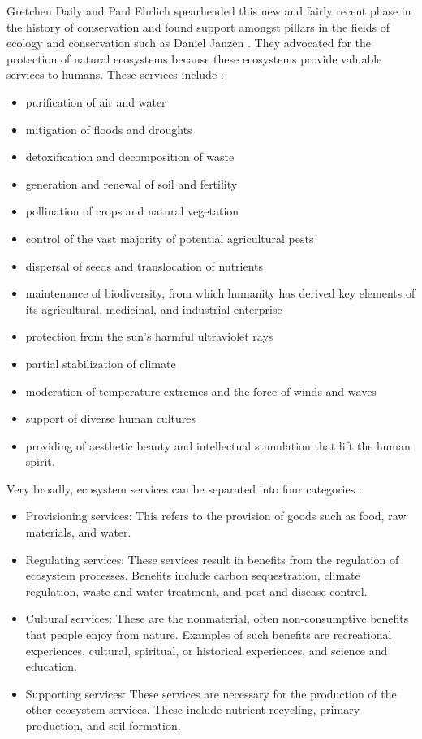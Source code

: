 \documentclass[rutwik_proposal.tex]{subfiles}
\begin{document}
Gretchen Daily and Paul Ehrlich spearheaded this new and fairly recent phase in the history of conservation and found support amongst pillars in the fields of ecology and conservation such as Daniel Janzen \cite{Daily97, Alexander97, Janzen00, Janzen98, Janzen2000}. They advocated for the protection of natural ecosystems because these ecosystems provide valuable services to humans. These services include \cite{Daily97}:
\begin{itemize}
\item purification of air and water
\item mitigation of floods and droughts
\item detoxification and decomposition of waste
\item generation and renewal of soil and fertility
\item pollination of crops and natural vegetation
\item control of the vast majority of potential agricultural pests
\item dispersal of seeds and translocation of nutrients
\item maintenance of biodiversity, from which humanity has derived key elements of its agricultural, medicinal, and industrial enterprise
\item protection from the sun's harmful ultraviolet rays
\item partial stabilization of climate
\item moderation of temperature extremes and the force of winds and waves
\item support of diverse human cultures
\item providing of aesthetic beauty and intellectual stimulation that lift the human spirit.
\end{itemize}
Very broadly, ecosystem services can be separated into four categories \cite{MEA05}:
\begin{itemize}
\item Provisioning services: This refers to the provision of goods such as food, raw materials, and water.
\item Regulating services: These services result in benefits from the regulation of ecosystem processes. Benefits include carbon sequestration, climate regulation, waste and water treatment, and pest and disease control.
\item Cultural services: These are the nonmaterial, often non-consumptive benefits that people enjoy from nature. Examples of such benefits are recreational experiences, cultural, spiritual, or historical experiences, and science and education.
\item Supporting services: These services are necessary for the production of the other ecosystem services. These include nutrient recycling, primary production, and soil formation.
\end{itemize}
\end{document}
